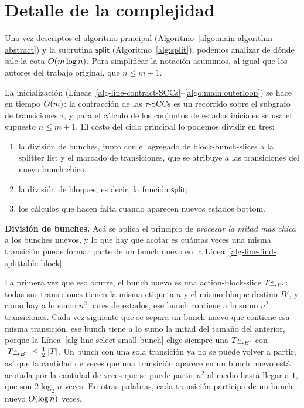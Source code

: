 \section{Detalle de la complejidad}
\label{sec:complejidad}

Una vez descriptos el algoritmo principal (Algoritmo~\ref{algo:main-algorithm-abstract}) y la subrutina $\mathsf{split}$ (Algoritmo~\ref{alg:split}), podemos analizar de dónde sale la cota ${O\!\left(m \log n\right)}$. Para simplificar la notación asumimos, al igual que los autores del trabajo original, que $n \leq m + 1$.

La inicialización (Líneas~\ref{alg-line-contract-SCCs}--\ref{algo:main:outerloop}) se hace en tiempo ${O\!\left(m\right)}$: la contracción de las $\tau$-SCCs es un recorrido sobre el subgrafo de transiciones $\tau$, y para el cálculo de los conjuntos de estados iniciales se usa el supuesto $n \leq m+1$. El costo del ciclo principal lo podemos dividir en tres:
\begin{enumerate}
\item la división de bunches, junto con el agregado de block-bunch-slices a la splitter list y el marcado de transiciones, que se atribuye a las transiciones del nuevo bunch chico;
\item la división de bloques, es decir, la función $\mathsf{split}$;
\item los cálculos que hacen falta cuando aparecen nuevos estados bottom.
\end{enumerate}

\textbf{División de bunches.} Acá se aplica el principio de \emph{procesar la mitad más chica} a los bunches nuevos, y lo que hay que acotar es cuántas veces una misma transición puede formar parte de un bunch nuevo en la Línea~\ref{alg-line-find-splittable-block}.

La primera vez que eso ocurre, el bunch nuevo es una action-block-slice $\TaB$: todas sus transiciones tienen la misma etiqueta $a$ y el mismo bloque destino $B'$, y como hay a lo sumo $n^2$ pares de estados, ese bunch contiene a lo sumo $n^2$ transiciones. Cada vez siguiente que se separa un bunch nuevo que contiene esa misma transición, ese bunch tiene a lo sumo la mitad del tamaño del anterior, porque la Línea~\ref{alg-line-select-small-bunch} elige siempre una $\TaB$ con $\size{\TaB} \leq \frac{1}{2}\size{T}$. Un bunch con una sola transición ya no se puede volver a partir, así que la cantidad de veces que una transición aparece en un bunch nuevo está acotada por la cantidad de veces que se puede partir $n^2$ al medio hasta llegar a $1$, que son $2\log_2 n$ veces. En otras palabras, cada transición participa de un bunch nuevo ${O\!\left(\log n\right)}$ veces.

